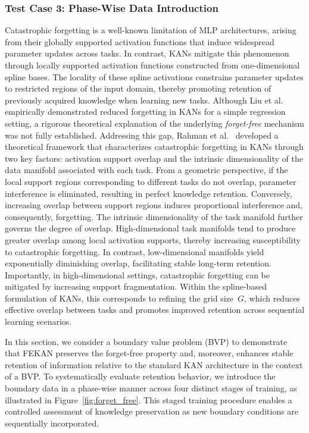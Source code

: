 \documentclass{article}
\begin{document}
\subsubsection{Test Case 3: Phase-Wise Data Introduction}
\label{subsec:pifekan_forgetfree}
Catastrophic forgetting is a well-known limitation of MLP architectures, arising from their globally supported activation functions that induce widespread parameter updates across tasks. In contrast, KANs mitigate this phenomenon through locally supported activation functions constructed from one-dimensional spline bases. The locality of these spline activations constrains parameter updates to restricted regions of the input domain, thereby promoting retention of previously acquired knowledge when learning new tasks. Although Liu et al.~\cite{liu2024kan} empirically demonstrated reduced forgetting in KANs for a simple regression setting, a rigorous theoretical explanation of the underlying \textit{forget-free} mechanism was not fully established. Addressing this gap, Rahman et al.~\cite{rahman2025catastrophic} developed a theoretical framework that characterizes catastrophic forgetting in KANs through two key factors: activation support overlap and the intrinsic dimensionality of the data manifold associated with each task. From a geometric perspective, if the local support regions corresponding to different tasks do not overlap, parameter interference is eliminated, resulting in perfect knowledge retention. Conversely, increasing overlap between support regions induces proportional interference and, consequently, forgetting. The intrinsic dimensionality of the task manifold further governs the degree of overlap. High-dimensional task manifolds tend to produce greater overlap among local activation supports, thereby increasing susceptibility to catastrophic forgetting. In contrast, low-dimensional manifolds yield exponentially diminishing overlap, facilitating stable long-term retention. Importantly, in high-dimensional settings, catastrophic forgetting can be mitigated by increasing support fragmentation. Within the spline-based formulation of KANs, this corresponds to refining the grid size~$G$, which reduces effective overlap between tasks and promotes improved retention across sequential learning scenarios.

In this section, we consider a boundary value problem (BVP) to demonstrate that FEKAN preserves the forget-free property and, moreover, enhances stable retention of information relative to the standard KAN architecture in the context of a BVP. To systematically evaluate retention behavior, we introduce the boundary data in a phase-wise manner across four distinct stages of training, as illustrated in Figure~\ref{fig:forget_free}. This staged training procedure enables a controlled assessment of knowledge preservation as new boundary conditions are sequentially incorporated.
\end{document}
